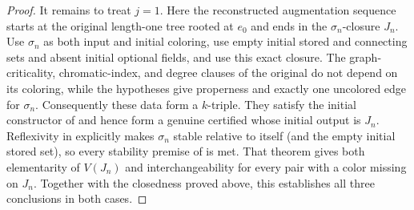 \begin{proof}
It remains to treat $j=1$.  Here the reconstructed augmentation sequence
starts at the original length-one tree rooted at $e_0$ and ends in the
$\sigma_n$-closure $J_n$.  Use $\sigma_n$ as both input and initial
coloring, use empty initial stored and connecting sets and absent initial
optional fields, and use this exact closure.  The graph-criticality,
chromatic-index, and degree clauses of the original
 do not depend on its coloring, while the hypotheses give
properness and exactly one uncolored edge for $\sigma_n$.  Consequently
these data form a $k$-triple.  They satisfy the initial constructor of
 and hence form a genuine certified
 whose initial output is $J_n$.  Reflexivity in
 explicitly makes $\sigma_n$ stable relative to itself (and
the empty initial stored set), so every stability premise of
 is met.  That theorem gives both
elementarity of $V(J_n)$ and interchangeability for every pair with a
color missing on $J_n$.  Together with the closedness proved above, this
establishes all three conclusions in both cases.
\end{proof}
